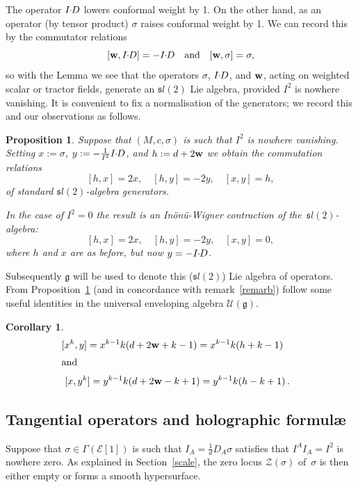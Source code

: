 \documentclass[a4paper,12pt]{amsart}
\def\Cal{\mathcal}
\newcommand{\ce}{{\Cal E}}
\def\cU{\mathcal{U}}
\newcommand{\si}{\sigma}
\newtheorem{proposition}[theorem]{Proposition}
\newtheorem{corollary}[theorem]{Corollary}
\theoremstyle{remark}
\begin{document}
 The operator $I\hspace*{-1mm} \cdot \hspace*{-1mm} D$ lowers conformal weight by 1. On the other
 hand, as an operator (by tensor product) $\si$ raises conformal
 weight by 1.  We can record this by the commutator relations
$$
[\w,\ID]=-\ID\quad \mbox{and} \quad [\w, \si] =\si, 
$$
so with the Lemma we see that the operators $\si$, $I\hspace*{-1mm} \cdot \hspace*{-1mm} D$,
 and $\mbox{\bf w}$, acting on weighted scalar or tractor fields, generate an
${\mathfrak sl}(2)$ Lie algebra, provided $I^2$ is nowhere vanishing. It
is convenient to fix a normalisation of the generators; we record
this and our observations as follows. 
\begin{proposition}\label{slprop} Suppose that $(M,c,\si)$ 
is such that
  $I^2$ is nowhere vanishing.   Setting $x:=
  \si$, $y:= -\frac{1}{I^2}I\hspace*{-1mm} \cdot \hspace*{-1mm} D$, and $h:=d+2\mbox{\bf w}$ we obtain the
  commutation relations
$$
[h,x]=2x, \quad [h,y]=-2y, \quad [x,y]=h, 
$$
of standard  ${\mathfrak sl}(2)$-algebra generators. 

In the case of $I^2=0$ the result is an
 In\"{o}n\"{u}-Wigner contraction of the~${\mathfrak sl}(2)$-algebra: 
$$
[h,x]=2x, \quad [h,y]=-2y, \quad [x,y]=0, 
$$ 
where  $h$ and $x$ are as before, but now $y=-I\hspace*{-1mm} \cdot \hspace*{-1mm} D$. 
\end{proposition}

\noindent
Subsequently $\mathfrak{g}$ will be used to denote this (${\mathfrak sl}(2)$)
Lie algebra of operators.
From Proposition~\ref{slprop}  (and  in  concordance  with  remark~\ref{remarb}) follow some useful identities in the universal
enveloping algebra $\cU(\mathfrak{g})$.
\begin{corollary}\label{corpid}
\begin{eqnarray}
&[x^k,y]=x^{k-1} k(d+2\w+k-1) = x^{k-1} k (h+k-1)&\nonumber \\[1mm]{} & {\rm  and }&\label{pid}\\[1mm]{} & \ [x,y^k]=y^{k-1}
k(d+2\w-k+1)=y^{k-1}k(h-k+1)\, .&\nonumber
\end{eqnarray}
\end{corollary}


\subsection{Tangential operators and holographic formul\ae\ }
\label{tangential ops}

Suppose that $\si\in \Gamma(\ce[1])$ is such that $I_A=\frac{1}{d}D_A
\si$ satisfies that $I^AI_A= I^2$ is nowhere zero.  As explained in
Section~\ref{scale}, the zero locus
$\mathcal{Z}(\si)$ of~$\si$ is then either empty or forms a smooth
hypersurface.
\end{document}
